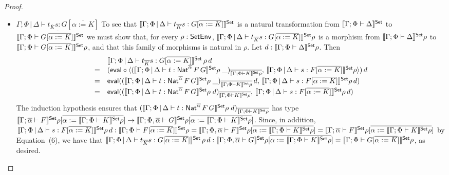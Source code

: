 \documentclass[acmsmall,review,anonymous]{acmart}
\theoremstyle{definition}
\begin{document}
\begin{proof}
\begin{itemize}
\item 
$\underline{\Gamma;\Phi \,|\, \Delta \vdash t_{\overline K} s: G
  [\overline{\alpha := K}]}$\; To see that $\llbracket{\Gamma;\Phi \,|\,
  \Delta \vdash t_{\overline K} s: G [\overline{\alpha := K}]}\rrbracket^{\mathsf{Set}}$ is a
  natural transformation from $\llbracket{\Gamma; \Phi \vdash \Delta}\rrbracket^{\mathsf{Set}}$ to
  $\llbracket{\Gamma;\Phi \vdash G [\overline{\alpha := K}]}\rrbracket^{\mathsf{Set}}$ we must
  show that, for every $\rho : \mathsf{SetEnv}$, $\llbracket{\Gamma;\Phi \,|\,
    \Delta \vdash t_{\overline K} s: G [\overline{\alpha := K}]}\rrbracket^{\mathsf{Set}}\rho$
  is a morphism from $\llbracket{\Gamma; \Phi \vdash \Delta}\rrbracket^{\mathsf{Set}}\rho$ to
  $\llbracket{\Gamma;\Phi \vdash G [\overline{\alpha := K}]}\rrbracket^{\mathsf{Set}}\rho$, and
  that this family of morphisms is natural in $\rho$. Let $d :
  \llbracket{\Gamma; \Phi \vdash \Delta}\rrbracket^{\mathsf{Set}}\rho$. Then
  \[\begin{array}{ll}
  & \llbracket{\Gamma;\Phi \,|\, \Delta \vdash t_{\overline K} s: G
  [\overline{\alpha := K}]}\rrbracket^{\mathsf{Set}}\,\rho\,d\\
= & (\mathsf{eval} \circ \langle (\llbracket{\Gamma;\Phi \,|\, \Delta \vdash
  t : \mathsf{Nat}^{\overline{\alpha}} \,F \,G}\rrbracket^{\mathsf{Set}}\rho\;
\_)_{\overline{\llbracket{\Gamma;\Phi \vdash K}\rrbracket^{\mathsf{Set}}\rho}},\,
\llbracket{\Gamma;\Phi \,|\, \Delta \vdash s: F [\overline{\alpha :=
      K}]}\rrbracket^{\mathsf{Set}}\rho \rangle)\,d\\
= & \mathsf{eval} ((\llbracket{\Gamma;\Phi \,|\, \Delta \vdash t :
  \mathsf{Nat}^{\overline{\alpha}} \,F \,G}\rrbracket^{\mathsf{Set}}\rho\;
\_)_{\overline{\llbracket{\Gamma;\Phi \vdash K}\rrbracket^{\mathsf{Set}}\rho}} \,d,\,
\llbracket{\Gamma;\Phi \,|\, \Delta \vdash s: F [\overline{\alpha :=
      K}]}\rrbracket^{\mathsf{Set}}\rho\, d)\\
= & \mathsf{eval} ((\llbracket{\Gamma;\Phi \,|\, \Delta \vdash t :
  \mathsf{Nat}^{\overline{\alpha}} \,F \,G}\rrbracket^{\mathsf{Set}}\rho\;
d)_{\overline{\llbracket{\Gamma;\Phi \vdash K}\rrbracket^{\mathsf{Set}}\rho}},\,
\llbracket{\Gamma;\Phi \,|\, \Delta \vdash s: F [\overline{\alpha :=
      K}]}\rrbracket^{\mathsf{Set}}\rho\, d)\\
\end{array}\]
The induction hypothesis ensures that $(\llbracket{\Gamma;\Phi \,|\,
  \Delta \vdash t : \mathsf{Nat}^{\overline{\alpha}} \,F \,G}\rrbracket^{\mathsf{Set}}\rho\;
d)_{\overline{\llbracket{\Gamma;\Phi \vdash K}\rrbracket^{\mathsf{Set}}\rho}}$ has type
$\llbracket{\Gamma; \overline{\alpha} \vdash F}\rrbracket^{\mathsf{Set}}\rho[\overline{\alpha :=
    \llbracket{\Gamma;\Phi \vdash K}\rrbracket^{\mathsf{Set}}\rho}] \to \llbracket{\Gamma;
  \Phi,\overline{\alpha} \vdash G}\rrbracket^{\mathsf{Set}}\rho[\overline{\alpha := \llbracket{\Gamma;\Phi \vdash
      K}\rrbracket^{\mathsf{Set}}\rho}]$.  Since, in addition, $\llbracket{\Gamma;\Phi \,|\,
  \Delta \vdash s: F [\overline{\alpha := K}]}\rrbracket^{\mathsf{Set}}\rho\, d :
\llbracket{\Gamma; \Phi \vdash F[\overline{\alpha := K}]}\rrbracket^{\mathsf{Set}}\rho =
\llbracket{\Gamma; \Phi, \overline{\alpha} \vdash F}\rrbracket^{\mathsf{Set}}\rho[\overline{\alpha :=
    \llbracket{\Gamma;\Phi \vdash K}\rrbracket^{\mathsf{Set}}\rho}] = \llbracket{\Gamma;
  \overline{\alpha} \vdash F}\rrbracket^{\mathsf{Set}}\rho[\overline{\alpha := \llbracket{\Gamma;\Phi \vdash
      K}\rrbracket^{\mathsf{Set}}\rho}]$ by Equation~(6),
we have that $\llbracket{\Gamma;\Phi \,|\, \Delta
  \vdash t_{\overline K} s: G [\overline{\alpha :=
      K}]}\rrbracket^{\mathsf{Set}}\,\rho\,d : \llbracket{\Gamma; \Phi,\overline{\alpha} \vdash
  G}\rrbracket^{\mathsf{Set}}\rho[\overline{\alpha := \llbracket{\Gamma;\Phi \vdash K}\rrbracket^{\mathsf{Set}}\rho}] =
\llbracket{\Gamma; \Phi \vdash G[\overline{\alpha := K}]}\rrbracket^{\mathsf{Set}}\rho$, as desired.


\end{itemize}
\end{proof}
\end{document}
